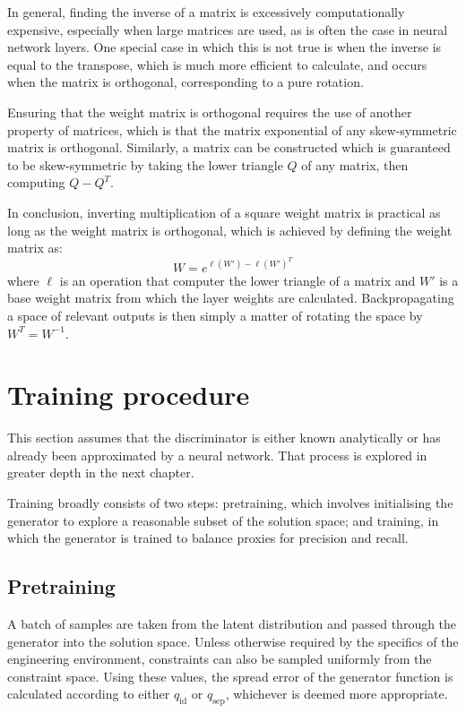 \documentclass[../../main.tex]{subfiles}
\begin{document}
In general, finding the inverse of a matrix is excessively computationally expensive, especially when large matrices are used, as is often the case in neural network layers.
One special case in which this is not true is when the inverse is equal to the transpose, which is much more efficient to calculate, and occurs when the matrix is orthogonal, corresponding to a pure rotation.

Ensuring that the weight matrix is orthogonal requires the use of another property of matrices, which is that the matrix exponential of any skew-symmetric matrix is orthogonal.
Similarly, a matrix can be constructed which is guaranteed to be skew-symmetric by taking the lower triangle $Q$ of any matrix, then computing $Q - Q^T$.

In conclusion, inverting multiplication of a square weight matrix is practical as long as the weight matrix is orthogonal, which is achieved by defining the weight matrix as:
$$W = e^{\ell(W') - \ell(W')^T}$$
where $\ell$ is an operation that computer the lower triangle of a matrix and $W'$ is a base weight matrix from which the layer weights are calculated.
Backpropagating a space of relevant outputs is then simply a matter of rotating the space by $W^T = W^{-1}$.

\section{Training procedure}

This section assumes that the discriminator is either known analytically or has already been approximated by a neural network.
That process is explored in greater depth in the next chapter.

Training broadly consists of two steps: pretraining, which involves initialising the generator to explore a reasonable subset of the solution space; and training, in which the generator is trained to balance proxies for precision and recall.

\subsection{Pretraining}

A batch of samples are taken from the latent distribution and passed through the generator into the solution space.
Unless otherwise required by the specifics of the engineering environment, constraints can also be sampled uniformly from the constraint space.
Using these values, the spread error of the generator function is calculated according to either $q_\text{id}$ or $q_\text{sep}$, whichever is deemed more appropriate.
\end{document}
